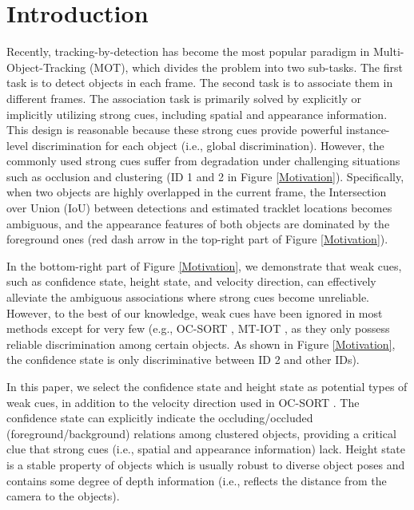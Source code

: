 \documentclass[letterpaper]{article} \usepackage{aaai23}  \usepackage{times}  \usepackage{helvet}  \usepackage{courier}  \usepackage[hyphens]{url}  \usepackage{graphicx} \urlstyle{rm} \def\UrlFont{\rm}  \usepackage{natbib}  \usepackage{caption} \frenchspacing  \setlength{\pdfpagewidth}{8.5in}  \setlength{\pdfpageheight}{11in}  \usepackage{algorithm}
\begin{document}
\section{Introduction}
Recently, tracking-by-detection \textcolor{blue}{\cite{bewley2016simple, wojke2017simple, chen2018real, zhang2021fairmot, zhang2022bytetrack, du2023strongsort, ren2023focus, qin2023motiontrack, cao2023observation}} has become the most popular paradigm in Multi-Object-Tracking (MOT), which divides the problem into two sub-tasks. The first task is to detect objects in each frame. The second task is to associate them in different frames. The association task is primarily solved by explicitly or implicitly utilizing strong cues, including spatial and appearance information. This design is reasonable because these strong cues provide powerful instance-level discrimination for each object (i.e., global discrimination). However, the commonly used strong cues suffer from degradation under challenging situations such as occlusion and clustering (ID 1 and 2 in Figure \ref{Motivation}). Specifically, when two objects are highly overlapped in the current frame, the Intersection over Union (IoU) between detections and estimated tracklet locations becomes ambiguous, and the appearance features of both objects are dominated by the foreground ones (red dash arrow in the top-right part of Figure \ref{Motivation}). 

In the bottom-right part of Figure \ref{Motivation}, we demonstrate that weak cues, such as confidence state, height state, and velocity direction, can effectively alleviate the ambiguous associations where strong cues become unreliable. However, to the best of our knowledge, weak cues have been ignored in most methods except for very few (e.g., OC-SORT \textcolor{blue}{\cite{cao2023observation}}, MT-IOT \textcolor{blue}{\cite{yan2022multiple}}, as they only possess reliable discrimination among certain objects. As shown in Figure \ref{Motivation}, the confidence state is only discriminative between ID 2 and other IDs). 

In this paper, we select the confidence state and height state as potential types of weak cues, in addition to the velocity direction used in OC-SORT \textcolor{blue}{\cite{cao2023observation}}. The confidence state can explicitly indicate the occluding/occluded (foreground/background) relations among clustered objects, providing a critical clue that strong cues (i.e., spatial and appearance information) lack. Height state is a stable property of objects which is usually robust to diverse object poses and contains some degree of depth information (i.e., reflects the distance from the camera to the objects).
\end{document}
